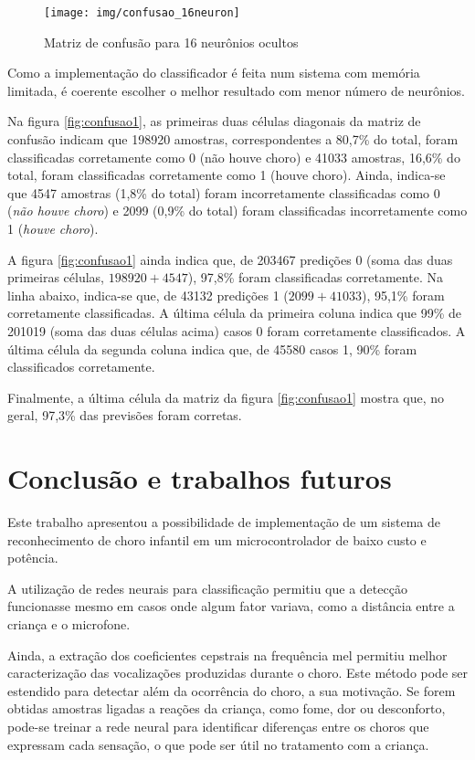 \documentclass[10pt,a4paper]{article}
\begin{document}
\begin{multicols*}{2}
\begin{figure}[H]
	\centering
	\texttt{[image: img/confusao\_16neuron]}
	\caption{Matriz de confusão para 16 neurônios ocultos}
	\label{fig:confusao3}
\end{figure}

Como a implementação do classificador é feita num sistema com memória limitada, é coerente escolher o melhor resultado com menor número de neurônios.

Na figura \ref{fig:confusao1}, as primeiras duas células diagonais da matriz de confusão indicam que 198920 amostras, correspondentes a 80,7\% do total, foram classificadas corretamente como 0 (não houve choro) e 41033 amostras, 16,6\% do total, foram classificadas corretamente como 1 (houve choro). Ainda, indica-se que 4547 amostras (1,8\% do total) foram incorretamente classificadas como 0 (\textit{não houve choro}) e 2099 (0,9\% do total) foram classificadas incorretamente como 1 (\textit{houve choro}).

A figura \ref{fig:confusao1} ainda indica que, de 203467 predições 0 (soma das duas primeiras células, $ 198920 + 4547 $), 97,8\% foram classificadas corretamente. Na linha abaixo, indica-se que, de 43132 predições 1 ($ 2099 + 41033 $), 95,1\% foram corretamente classificadas. A última célula da primeira coluna indica que 99\% de 201019 (soma das duas células acima) casos 0 foram corretamente classificados. A última célula da segunda coluna indica que, de 45580 casos 1, 90\% foram classificados corretamente.

Finalmente, a última célula da matriz da figura \ref{fig:confusao1} mostra que, no geral, 97,3\% das previsões foram corretas.

\section{Conclusão e trabalhos futuros}

Este trabalho apresentou a possibilidade de implementação de um sistema de reconhecimento de choro infantil em um microcontrolador de baixo custo e potência.

A utilização de redes neurais para classificação permitiu que a detecção funcionasse mesmo em casos onde algum fator variava, como a distância entre a criança e o microfone.

Ainda, a extração dos coeficientes cepstrais na frequência mel permitiu melhor caracterização das vocalizações produzidas durante o choro. Este método pode ser estendido para detectar além da ocorrência do choro, a sua motivação. Se forem obtidas amostras ligadas a reações da criança, como fome, dor ou desconforto, pode-se treinar a rede neural para identificar diferenças entre os choros que expressam cada sensação, o que pode ser útil no tratamento com a criança.


\end{multicols*}
\end{document}
